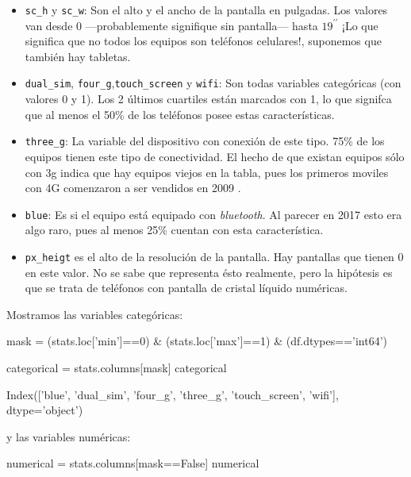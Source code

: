 \documentclass[12pt,twocolumn,a4paper]{apa_article}
\begin{document}
\begin{itemize}
  \item \texttt{sc\_h} y \texttt{sc\_w}: Son el alto y el ancho de la pantalla en pulgadas.  Los valores van desde 0 —probablemente signifique sin pantalla— hasta $19^{\prime\prime}$ ¡Lo que significa que no todos los equipos son teléfonos celulares!, suponemos que también hay tabletas.
  \item \texttt{dual\_sim}, \texttt{four\_g},\texttt{touch\_screen} y  \texttt{wifi}: Son todas variables categóricas (con valores 0 y 1). Los 2 últimos cuartiles están marcados con 1, lo que signifca que al menos el 50\% de los teléfonos posee estas características. 
  \item  \texttt{three\_g}: La variable del dispositivo con conexión de este tipo. 75\% de los equipos tienen este tipo de conectividad. El hecho de que existan equipos sólo con 3g indica que hay equipos viejos en la tabla, pues los primeros moviles con 4G comenzaron a ser vendidos en 2009 \parencite{torstensson_2009}.
  \item \texttt{blue}: Es si el equipo está equipado con \textit{bluetooth}. Al parecer en 2017 esto era algo raro, pues al menos 25\% cuentan con esta característica.
  \item \texttt{px\_heigt} es el alto de la resolución de la pantalla. Hay pantallas que tienen 0 en este valor. No se sabe que representa ésto realmente, pero la hipótesis es que se trata de teléfonos con pantalla de cristal líquido numéricas. 
\end{itemize}



Mostramos las variables categóricas:

\setcounter{ipythcntr}{6}
\begin{ipynbin}
mask = (stats.loc['min']==0) & (stats.loc['max']==1) & (df.dtypes=='int64')

categorical = stats.columns[mask]
categorical
\end{ipynbin}

\begin{ipynbout}
Index(['blue', 'dual_sim', 'four_g', 'three_g', 'touch_screen', 'wifi'], dtype='object')
\end{ipynbout}

\noindent y las variables numéricas:

\begin{ipynbin}
numerical = stats.columns[mask==False]
numerical
\end{ipynbin}
  
\end{document}
